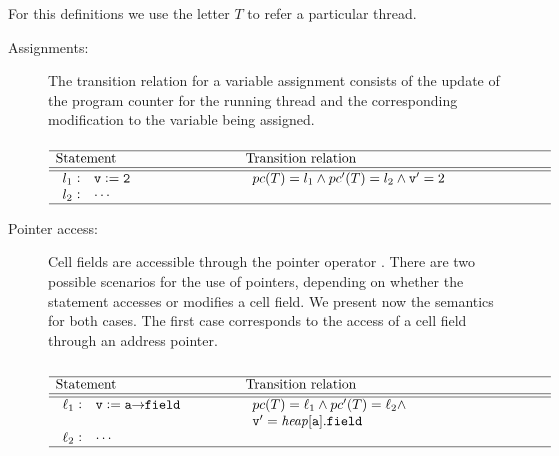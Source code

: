 For this definitions we use the letter $T$ to refer a particular thread.

\begin{description}
\item [Assignments:]
		The transition relation for a variable assignment consists of the 
		update of the program counter for the running thread and the 
		corresponding modification to the variable being assigned.
\[
\begin{array}[t]{p{8em}@{\hspace{6em}}p{\longtablesize}}
	\hline
	Statement & Transition relation \\ \hline\hline
	$\begin{array}[t]{l@{\hspace{0.3em}}c@{\hspace{1em}}l}
		l_1 & : & \mathtt{v := 2} \\
		l_2 & : & \mathtt{\cdots}
	\end{array}$
	&
	$\begin{array}[t]{ll}
		 \pc(T) = l_1 \andcond
		 \pc'(T) = l_2 \andcond
		 \mathtt{v}' = 2
	 \end{array}$ \\ 
	 \hline
\end{array}
\]

	\item [Pointer access:]
		Cell fields are accessible through the pointer operator \pointsto.
%
		There are two possible scenarios for the use of pointers, depending on 
		whether the statement accesses or modifies a cell field.
%
		We present now the semantics for both cases.
%
		The first case corresponds to the access of a cell field through an 
		address pointer.
%


\[
\begin{array}[t]{p{8em}@{\hspace{6em}}p{\longtablesize}}
	\hline
	Statement & Transition relation \\ \hline\hline
	$\begin{array}[t]{l@{\hspace{0.3em}}c@{\hspace{1em}}l}
		\ell_1 & : & \mathtt{v := a \pointsto field} \\ \\
		\ell_2 & : & \mathtt{\cdots}
	\end{array}$
	&
	$\begin{array}[t]{ll}
		 \pc(T) = \ell_1 \andcond
		 \pc'(T) = \ell_2 \andcond \\
		 \mathtt{v}' = \heap[\mathtt{a}].\mathtt{field}
	 \end{array}$ \\
	 \hline
\end{array}
\]


\end{description}
